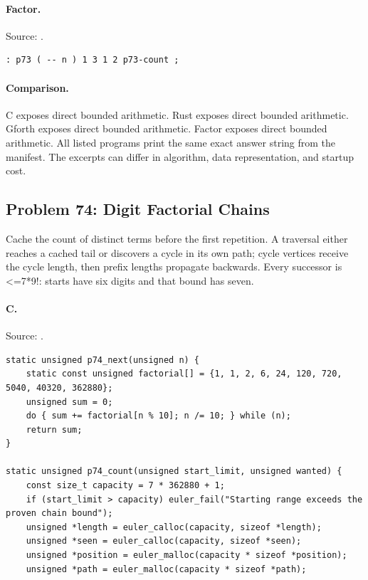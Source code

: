 \paragraph{Factor.} Source: .
\begin{lstlisting}
: p73 ( -- n ) 1 3 1 2 p73-count ;
\end{lstlisting}

\paragraph{Comparison.}
C exposes direct bounded arithmetic. Rust exposes direct bounded arithmetic. Gforth exposes direct bounded arithmetic. Factor exposes direct bounded arithmetic.
All listed programs print the same exact answer string from the manifest. The excerpts can differ in algorithm, data representation, and startup cost.

\subsection{Problem 74: Digit Factorial Chains}
\label{walkthrough:p74}
Cache the count of distinct terms before the first repetition. A traversal either reaches a cached tail or discovers a cycle in its own path; cycle vertices receive the cycle length, then prefix lengths propagate backwards. Every successor is <=7*9!: starts have six digits and that bound has seven.

\paragraph{C.} Source: .
\begin{lstlisting}
static unsigned p74_next(unsigned n) {
    static const unsigned factorial[] = {1, 1, 2, 6, 24, 120, 720, 5040, 40320, 362880};
    unsigned sum = 0;
    do { sum += factorial[n % 10]; n /= 10; } while (n);
    return sum;
}

static unsigned p74_count(unsigned start_limit, unsigned wanted) {
    const size_t capacity = 7 * 362880 + 1;
    if (start_limit > capacity) euler_fail("Starting range exceeds the proven chain bound");
    unsigned *length = euler_calloc(capacity, sizeof *length);
    unsigned *seen = euler_calloc(capacity, sizeof *seen);
    unsigned *position = euler_malloc(capacity * sizeof *position);
    unsigned *path = euler_malloc(capacity * sizeof *path);
\end{lstlisting}

